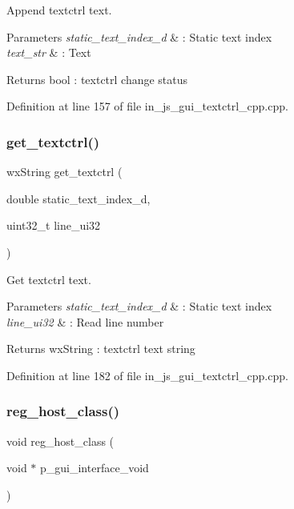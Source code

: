 Append textctrl text. 


\begin{DoxyParams}{Parameters}
{\em static\+\_\+text\+\_\+index\+\_\+d} & \+: Static text index \\
\hline
{\em text\+\_\+str} & \+: Text \\
\hline
\end{DoxyParams}
\begin{DoxyReturn}{Returns}
bool \+: textctrl change status 
\end{DoxyReturn}


Definition at line 157 of file in\+\_\+js\+\_\+gui\+\_\+textctrl\+\_\+cpp.\+cpp.

\mbox{\label{group___static__text_ga183019d50ebf23bce6ec269e6de3e2e2}} 
\subsubsection{get\_textctrl()}
{\footnotesize\ttfamily wx\+String get\+\_\+textctrl (\begin{DoxyParamCaption}\item[{double}]{static\+\_\+text\+\_\+index\+\_\+d,  }\item[{uint32\+\_\+t}]{line\+\_\+ui32 }\end{DoxyParamCaption})}



Get textctrl text. 


\begin{DoxyParams}{Parameters}
{\em static\+\_\+text\+\_\+index\+\_\+d} & \+: Static text index \\
\hline
{\em line\+\_\+ui32} & \+: Read line number \\
\hline
\end{DoxyParams}
\begin{DoxyReturn}{Returns}
wx\+String \+: textctrl text string 
\end{DoxyReturn}


Definition at line 182 of file in\+\_\+js\+\_\+gui\+\_\+textctrl\+\_\+cpp.\+cpp.

\mbox{\label{group___static__text_gac715b4a43bb361fc96ce6f1b50d68a8b}} 
\subsubsection{reg\_host\_class()}
{\footnotesize\ttfamily void reg\+\_\+host\+\_\+class (\begin{DoxyParamCaption}\item[{void $\ast$}]{p\+\_\+gui\+\_\+interface\+\_\+void }\end{DoxyParamCaption})}



